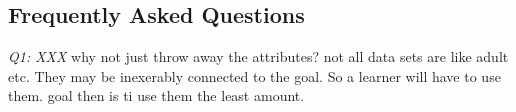 \documentclass{NSF}
\newcommand{\IT}{{\bf {\sffamily TINKER}}}
\newenvironment{myitemize}
{ \begin{itemize}
    \setlength{\itemsep}{0pt}
    \setlength{\parskip}{0pt}
    \setlength{\parsep}{0pt}     }
{ \end{itemize}                  }
\newcommand{\bi}{\begin{myitemize}}
\newcommand{\ei}{\end{myitemize}}
\newcommand{\tbl}[1]{Table~\ref{tbl:#1}}
\newcommand{\IT}{{\bf {\sffamily TINKER}}}
\begin{document}
\begin{nsfdescription}
% 



 





\section{Frequently Asked Questions}\label{tion:faq}
{\em Q1: XXX}
 why not just throw away the attributes? not all data sets are like adult etc. They may be inexerably
 connected to the goal. So a learner will have to use them. goal then is ti use them the least amount.
 

\end{nsfdescription}
\end{document}
